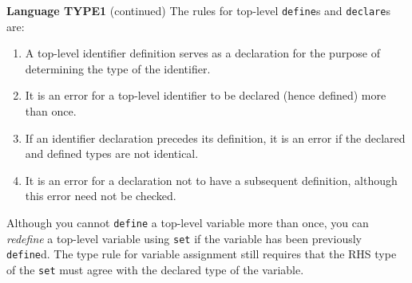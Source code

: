 \begin{minipage}[t]{\sw}
\slidenumber
\LARGE
{\bf Language TYPE1} (continued)\exx
The rules for top-level \verb'define's and \verb'declare's are:
\begin{enumerate}
\item A top-level identifier definition serves as a declaration
      for the purpose of determining the type of the identifier.
\item It is an error for a top-level identifier
      to be declared (hence defined) more than once.
\item If an identifier declaration precedes its definition,
      it is an error
      if the declared and defined types are not identical.
\item It is an error for a declaration
      not to have a subsequent definition,
      although this error need not be checked.
\end{enumerate}
Although you cannot \verb'define' a top-level variable more than once,
you can {\em redefine} a top-level variable
using \verb'set' if the variable has been previously \verb'define'd.
The type rule for variable assignment still
requires that the RHS type of the \verb'set'
must agree with the declared type of the variable.
\end{minipage}
